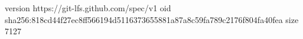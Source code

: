 version https://git-lfs.github.com/spec/v1
oid sha256:818cd44f27ec8ff566194d5116373655881a87a8c59fa789c2176f804fa40fea
size 7127
